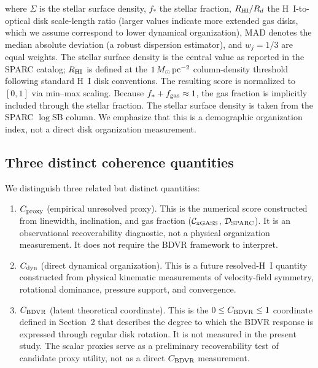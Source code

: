 \documentclass[11pt]{article}
\begin{document}
where $\Sigma$ is the stellar surface density, $f_*$ the stellar fraction, $R_{\rm HI}/R_d$ the H~I-to-optical disk scale-length ratio (larger values indicate more extended gas disks, which we assume correspond to lower dynamical organization), MAD denotes the median absolute deviation (a robust dispersion estimator), and $w_j = 1/3$ are equal weights. The stellar surface density is the central value as reported in the SPARC catalog; $R_{\rm HI}$ is defined at the $1\,M_\odot\,{\rm pc}^{-2}$ column-density threshold following standard H~I disk conventions. The resulting score is normalized to $[0,1]$ via min--max scaling. Because $f_* + f_{\rm gas} \approx 1$, the gas fraction is implicitly included through the stellar fraction. The stellar surface density is taken from the SPARC $\log$SB column. We emphasize that this is a demographic organization index, not a direct disk organization measurement.

\subsection{Three distinct coherence quantities}

We distinguish three related but distinct quantities:

\begin{enumerate}

\item \textbf{$C_{\rm proxy}$} (empirical unresolved proxy). This is the numerical score constructed from linewidth, inclination, and gas fraction ($\mathcal{C}_{\rm xGASS}$, $\mathcal{D}_{\rm SPARC}$). It is an observational recoverability diagnostic, not a physical organization measurement. It does not require the BDVR framework to interpret.

\item \textbf{$C_{\rm dyn}$} (direct dynamical organization). This is a future resolved-H~I quantity constructed from physical kinematic measurements of velocity-field symmetry, rotational dominance, pressure support, and convergence.

\item \textbf{$C_{\rm BDVR}$} (latent theoretical coordinate). This is the $0 \leq C_{\rm BDVR} \leq 1$ coordinate defined in Section~2 that describes the degree to which the BDVR response is expressed through regular disk rotation. It is not measured in the present study. The scalar proxies serve as a preliminary recoverability test of candidate proxy utility, not as a direct $C_{\rm BDVR}$ measurement.

\end{enumerate}
\end{document}
